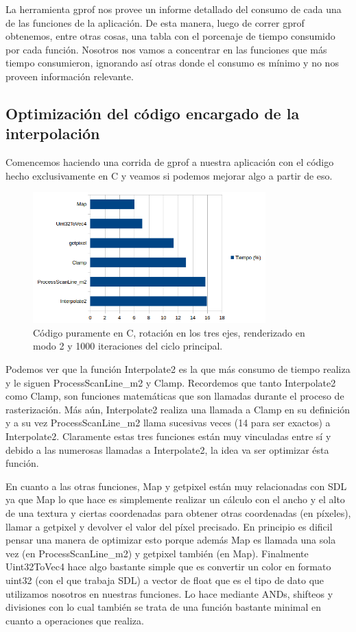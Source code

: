 \documentclass[a4paper]{article}
\newcounter{col}
\begin{document}
La herramienta gprof nos provee un informe detallado del consumo de cada una de las funciones de la aplicación. De esta manera, luego de correr gprof obtenemos, entre otras cosas, una tabla con el porcenaje de tiempo consumido por cada función. Nosotros nos vamos a concentrar en las funciones que más tiempo consumieron, ignorando así otras donde el consumo es mínimo y no nos proveen información relevante.

\subsection{Optimización del código encargado de la interpolación}
Comencemos haciendo una corrida de gprof a nuestra aplicación con el código hecho exclusivamente en C y veamos si podemos mejorar algo a partir de eso. 

\begin{figure}[h]
    \centering
    \includegraphics[width=0.8\textwidth]{Imagenes/gprof1.png}
    \caption{Código puramente en C, rotación en los tres ejes, renderizado en modo 2 y 1000 iteraciones del ciclo principal.}
    \label{fig:mesh1}
\end{figure}


Podemos ver que la función Interpolate2 es la que más consumo de tiempo realiza y le siguen ProcessScanLine_m2 y Clamp. Recordemos que tanto Interpolate2 como Clamp, son funciones matemáticas que son llamadas durante el proceso de rasterización. Más aún, Interpolate2 realiza una llamada a Clamp en su definición y a su vez ProcessScanLine_m2 llama sucesivas veces (14 para ser exactos) a Interpolate2. Claramente estas tres funciones están muy vinculadas entre sí y debido a las numerosas llamadas a Interpolate2, la idea va ser optimizar ésta función.

En cuanto a las otras funciones, Map y getpixel están muy relacionadas con SDL ya que Map lo que hace es simplemente realizar un cálculo con el ancho y el alto de una textura y ciertas coordenadas para obtener otras coordenadas (en píxeles), llamar a getpixel y devolver el valor del píxel precisado. En principio es dificil pensar una manera de optimizar esto porque además Map es llamada una sola vez (en ProcessScanLine_m2) y getpixel también (en Map). Finalmente Uint32ToVec4 hace algo bastante simple que es convertir un color en formato uint32 (con el que trabaja SDL) a vector de float que es el tipo de dato que utilizamos nosotros en nuestras funciones. Lo hace mediante ANDs, shifteos y divisiones con lo cual también se trata de una función bastante minimal en cuanto a operaciones que realiza.
\end{document}
